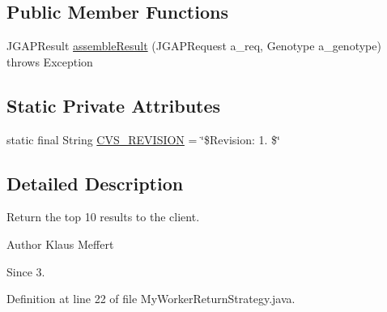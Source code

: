 \subsection*{Public Member Functions}
\begin{DoxyCompactItemize}
\item 
J\-G\-A\-P\-Result \hyperlink{classexamples_1_1grid_1_1evolution_distributed_1_1_my_worker_return_strategy_a3ebb7ac71015b749f6185c824aafa2a2}{assemble\-Result} (J\-G\-A\-P\-Request a\-\_\-req, Genotype a\-\_\-genotype)  throws Exception 
\end{DoxyCompactItemize}
\subsection*{Static Private Attributes}
\begin{DoxyCompactItemize}
\item 
static final String \hyperlink{classexamples_1_1grid_1_1evolution_distributed_1_1_my_worker_return_strategy_a3d8d87b9696fe2b7007c6ff055f3820d}{C\-V\-S\-\_\-\-R\-E\-V\-I\-S\-I\-O\-N} = \char`\"{}\$Revision\-: 1. \$\char`\"{}
\end{DoxyCompactItemize}


\subsection{Detailed Description}
Return the top 10 results to the client.

\begin{DoxyAuthor}{Author}
Klaus Meffert 
\end{DoxyAuthor}
\begin{DoxySince}{Since}
3. 
\end{DoxySince}


Definition at line 22 of file My\-Worker\-Return\-Strategy.\-java.



